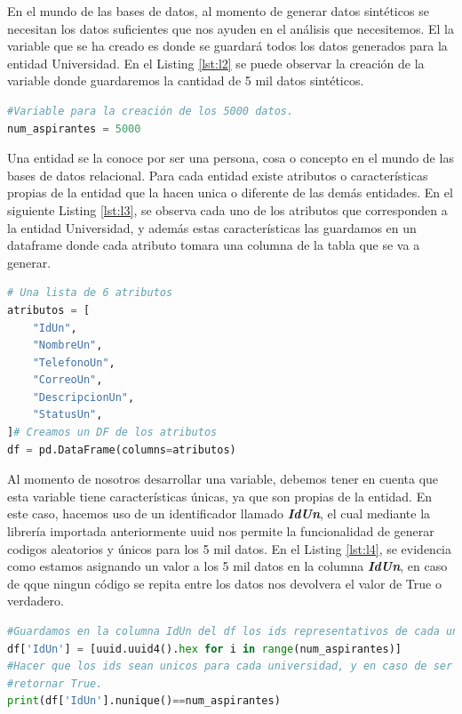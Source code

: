 \documentclass[10pt, oneside,spanish]{article}   	%
\begin{document}
En el mundo de las bases de datos, al momento de generar datos sintéticos se necesitan los datos suficientes que nos ayuden en el análisis que necesitemos. El la variable que se ha creado es donde se guardará todos los datos generados para la entidad Universidad. En el Listing \ref{lst:l2} se puede observar la creación de la variable donde guardaremos la cantidad de 5 mil datos sintéticos.
\begin{lstlisting}[language=Python,label={lst:l2},caption=Variable para guardar los datos sintéticos,frame=single, ]
#Variable para la creación de los 5000 datos.
num_aspirantes = 5000
\end{lstlisting}
Una entidad se la conoce por ser una persona, cosa o concepto en el mundo de las bases de datos relacional. Para cada entidad existe atributos o características propias de la entidad que la hacen unica o diferente de las demás entidades. En el siguiente Listing \ref{lst:l3}, se observa cada uno de los atributos que corresponden a la entidad Universidad, y además estas características las guardamos en un dataframe donde cada atributo tomara una columna de la tabla que se va a generar.
\begin{lstlisting}[language=Python,label={lst:l3},caption=Lista de atributos de la entidad Universidad,frame=single, ]
# Una lista de 6 atributos
atributos = [
    "IdUn",
    "NombreUn",
    "TelefonoUn",
    "CorreoUn",
    "DescripcionUn",
    "StatusUn",
]# Creamos un DF de los atributos
df = pd.DataFrame(columns=atributos)
\end{lstlisting}
Al momento de nosotros desarrollar una variable, debemos tener en cuenta que esta variable tiene características únicas, ya que son propias de la entidad. En este caso, hacemos uso de un identificador llamado \textbf{\textit{IdUn}}, el cual mediante la librería importada anteriormente uuid nos permite la funcionalidad de generar codigos aleatorios y únicos para los 5 mil datos. En el Listing \ref{lst:l4}, se evidencia como estamos asignando un valor a los 5 mil datos en la columna \textbf{\textit{IdUn}}, en caso de qque ningun código se repita entre los datos nos devolvera el valor de True o verdadero.
\begin{lstlisting}[language=Python,label={lst:l4},caption=Identificador único para la variable Universidad,frame=single, ]
#Guardamos en la columna IdUn del df los ids representativos de cada universidad
df['IdUn'] = [uuid.uuid4().hex for i in range(num_aspirantes)]
#Hacer que los ids sean unicos para cada universidad, y en caso de ser así 
#retornar True.
print(df['IdUn'].nunique()==num_aspirantes)
\end{lstlisting}
\end{document}
